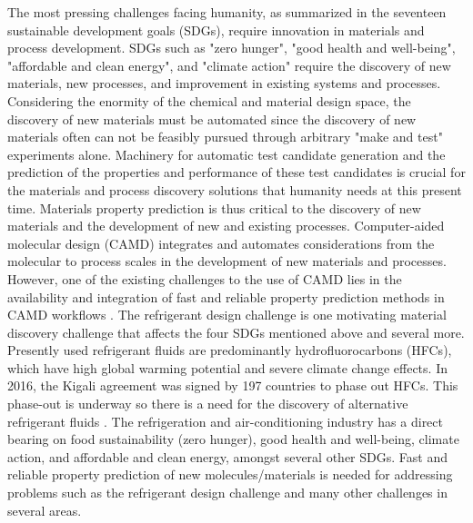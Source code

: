 \documentclass[journal=jacsat,manuscript=article]{achemso}
\begin{document}
The most pressing challenges facing humanity, as summarized in the seventeen sustainable development goals (SDGs), require innovation in materials and process development. 
SDGs such as "zero hunger", "good health and well-being", "affordable and clean energy", and "climate action" \cite{unitednations17GOALSSustainable2015} require the discovery of new materials, new processes, and improvement in existing systems and processes.  
Considering the enormity of the chemical and material design space, the discovery of new materials must be automated since the discovery of new materials often can not be feasibly pursued through arbitrary "make and test" experiments alone. 
Machinery for automatic test candidate generation and the prediction of the properties and performance of these test candidates is crucial for the materials and process discovery solutions that humanity needs at this present time.
Materials property prediction is thus critical to the discovery of new materials and the development of new and existing processes. 
Computer-aided molecular design (CAMD) integrates and automates considerations from the molecular to process scales in the development of new materials and processes. 
However, one of the existing challenges to the use of CAMD lies in the availability and integration of fast and reliable property prediction methods in CAMD workflows \cite{adjimanProcessSystemsEngineering2021}.
The refrigerant design challenge is one motivating material discovery challenge that affects the four SDGs mentioned above and several more. 
Presently used refrigerant fluids are predominantly hydrofluorocarbons (HFCs), which have high global warming potential and severe climate change effects. In 2016, the Kigali agreement was signed by 197 countries to phase out HFCs. 
This phase-out is underway so there is a need for the discovery of alternative refrigerant fluids
\cite{departmentofecologystateofwashingtonHydrofluorocarbons2023, usaepaReducingHydrofluorocarbonHFC2014, davenportNationsFightingPowerful2016, mcgrathClimateChangeMonumental2016, veldersLargeContributionProjected2009}. 
The refrigeration and air-conditioning industry has a direct bearing on food sustainability (zero hunger), good health and well-being, climate action, and affordable and clean energy, amongst several other SDGs. 
Fast and reliable property prediction of new molecules/materials is needed for addressing problems such as the refrigerant design challenge and many other challenges in several areas.
\end{document}

